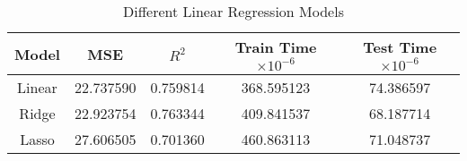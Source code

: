 \begin{table}[H]
\centering
\caption{Different Linear Regression Models}
\label{tab:models}
\begin{tabular}{ccccc}
\toprule
Model & MSE & $R^2$ & Train Time $\times 10^{-6}$ & Test Time $\times 10^{-6}$ \\
\midrule
Linear & 22.737590 & 0.759814 & 368.595123 & 74.386597 \\
Ridge & 22.923754 & 0.763344 & 409.841537 & 68.187714 \\
Lasso & 27.606505 & 0.701360 & 460.863113 & 71.048737 \\
\bottomrule
\end{tabular}
\end{table}
